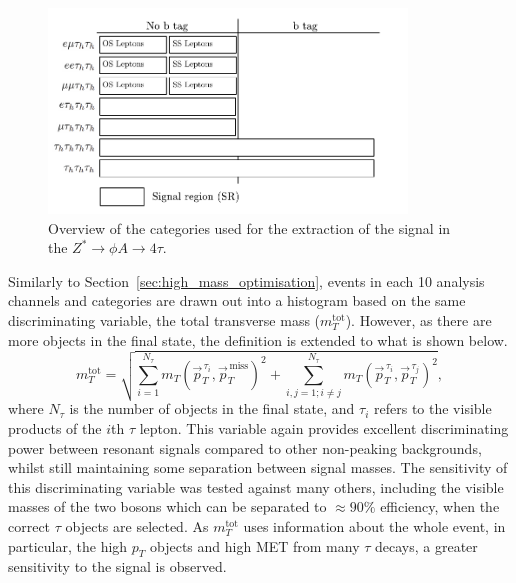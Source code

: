 \begin{figure}[!hbtp]
\centering
    \includegraphics[width=0.85\textwidth]{Figures/event-categories_4tau.pdf}
\caption[Diagram of the categories used to extract $Z^{*}\rightarrow \phi A \rightarrow 4\tau$.]{Overview of the categories used for the extraction of the signal in the $Z^{*}\rightarrow \phi A \rightarrow 4\tau$.}
\label{fig:4tau_categories}
\end{figure}

Similarly to Section~\ref{sec:high_mass_optimisation}, events in each 10 analysis channels and categories are drawn out into a histogram based on the same discriminating variable, the total transverse mass ($m_{T}^{\text{tot
}}$).
However, as there are more objects in the final state, the definition is extended to what is shown below.
\begin{equation}
m_{T}^{\text{tot}} = \sqrt{ \sum_{i=1}^{N_\tau} m_{T}(\vec{p}_{T}^{\hspace{2pt}\tau_i},\vec{p}_{T}^{\hspace{2pt}\text{miss}})^2 + \sum_{i,j=1; i \neq j}^{N_\tau} m_{T}(\vec{p}_{T}^{\hspace{2pt}\tau_i},\vec{p}_{T}^{\hspace{2pt}\tau_j})^2 },  
\end{equation}
where $N_\tau$ is the number of objects in the final state, and $\tau_i$ refers to the visible products of the $i$th $\tau$ lepton.
This variable again provides excellent discriminating power between resonant signals compared to other non-peaking backgrounds, whilst still maintaining some separation between signal masses.
The sensitivity of this discriminating variable was tested against many others, including the visible masses of the two bosons which can be separated to $\approx 90\%$ efficiency, when the correct $\tau$ objects are selected. 
As $m_{T}^{\text{tot}}$ uses information about the whole event, in particular, the high $p_{T}$ objects and high \ac{MET} from many $\tau$ decays, a greater sensitivity to the signal is observed. \\

